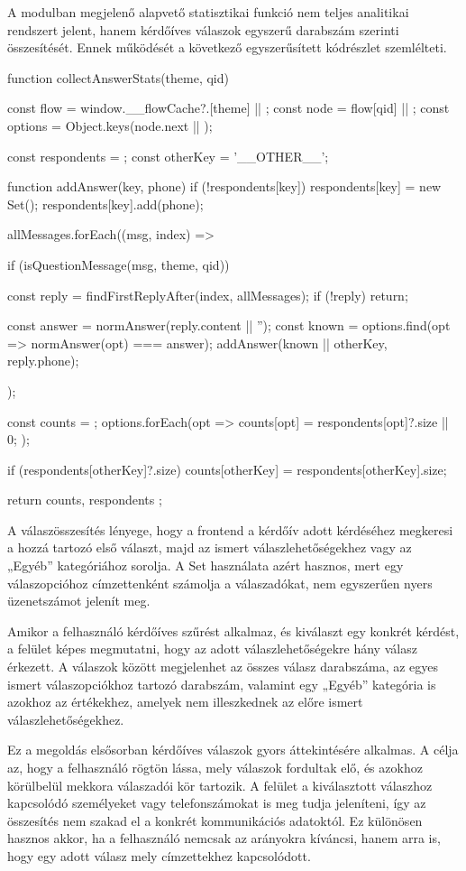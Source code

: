 A modulban megjelenő alapvető statisztikai funkció nem teljes analitikai rendszert jelent, hanem kérdőíves válaszok egyszerű darabszám szerinti összesítését. Ennek működését a következő egyszerűsített kódrészlet szemlélteti.

\begin{CodeBlock}
function collectAnswerStats(theme, qid) {
  const flow = window.__flowCache?.[theme] || {};
  const node = flow[qid] || {};
  const options = Object.keys(node.next || {});

  const respondents = {};
  const otherKey = '__OTHER__';

  function addAnswer(key, phone) {
    if (!respondents[key]) respondents[key] = new Set();
    respondents[key].add(phone);
  }

  allMessages.forEach((msg, index) => {
    if (isQuestionMessage(msg, theme, qid)) {
      const reply = findFirstReplyAfter(index, allMessages);
      if (!reply) return;

      const answer = normAnswer(reply.content || '');
      const known = options.find(opt => normAnswer(opt) === answer);
      addAnswer(known || otherKey, reply.phone);
    }
  });

  const counts = {};
  options.forEach(opt => {
    counts[opt] = respondents[opt]?.size || 0;
  });

  if (respondents[otherKey]?.size) {
    counts[otherKey] = respondents[otherKey].size;
  }

  return { counts, respondents };
}
\end{CodeBlock}

A válaszösszesítés lényege, hogy a frontend a kérdőív adott kérdéséhez megkeresi a hozzá tartozó első választ, majd az ismert válaszlehetőségekhez vagy az „Egyéb” kategóriához sorolja. A Set használata azért hasznos, mert egy válaszopcióhoz címzettenként számolja a válaszadókat, nem egyszerűen nyers üzenetszámot jelenít meg.

Amikor a felhasználó kérdőíves szűrést alkalmaz, és kiválaszt egy konkrét kérdést, a felület képes megmutatni, hogy az adott válaszlehetőségekre hány válasz érkezett. A válaszok között megjelenhet az összes válasz darabszáma, az egyes ismert válaszopciókhoz tartozó darabszám, valamint egy „Egyéb” kategória is azokhoz az értékekhez, amelyek nem illeszkednek az előre ismert válaszlehetőségekhez.

Ez a megoldás elsősorban kérdőíves válaszok gyors áttekintésére alkalmas. A célja az, hogy a felhasználó rögtön lássa, mely válaszok fordultak elő, és azokhoz körülbelül mekkora válaszadói kör tartozik. A felület a kiválasztott válaszhoz kapcsolódó személyeket vagy telefonszámokat is meg tudja jeleníteni, így az összesítés nem szakad el a konkrét kommunikációs adatoktól. Ez különösen hasznos akkor, ha a felhasználó nemcsak az arányokra kíváncsi, hanem arra is, hogy egy adott válasz mely címzettekhez kapcsolódott.

